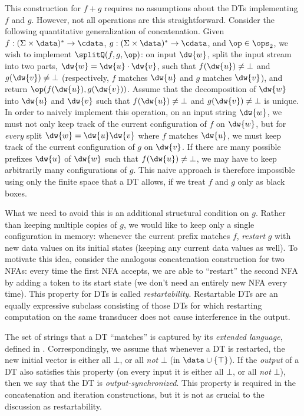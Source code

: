 This construction for $f+g$ requires no assumptions about the DTs implementing $f$ and $g$.
However, not all operations are this straightforward.
Consider the following quantitative generalization of concatenation. Given $f: (\Sigma \times \data)^{*} \to \cdata$, $g: (\Sigma \times \data)^{*} \to \cdata$, and $\op \in \ops_2$, we wish to implement $\splitQ(f,g,\op)$:
on input $\dw{w}$, split the input stream into two parts, $\dw{w} = \dw{u} \cdot \dw{v}$, such that $f(\dw{u}) \ne \bot$ and $g(\dw{v}) \ne \bot$ (respectively, $f$ matches $\dw{u}$ and $g$ matches $\dw{v}$), and return $\op(f(\dw{u}),g(\dw{v}))$. Assume that the decomposition of $\dw{w}$ into $\dw{u}$ and $\dw{v}$ such that $f(\dw{u}) \ne \bot$ and $g(\dw{v}) \ne \bot$ is unique.
In order to naively implement this operation, on an input string $\dw{w}$, we must not only keep track of the current
configuration of $f$ on $\dw{w}$,
but for \emph{every} split $\dw{w} = \dw{u} \dw{v}$ where $f$ matches $\dw{u}$,
we must keep track of the current configuration of $g$ on $\dw{v}$.
If there are many possible prefixes $\dw{u}$ of $\dw{w}$ such that $f(\dw{u}) \ne \bot$, we may have to keep arbitrarily many configurations of $g$. This naive approach is therefore impossible using only the finite space that a DT allows, if we treat $f$ and $g$ only as black boxes.

What we need to avoid this is an additional structural condition on $g$. Rather than keeping multiple copies of $g$, we would like to keep only a single configuration in memory: whenever the current prefix matches $f$, \emph{restart} $g$ with new data values on its initial states (keeping any current data values as well).
To motivate this idea, consider the analogous concatenation construction for two NFAs: every time the first NFA accepts, we are able to ``restart'' the second NFA by adding a token to its start state (we don't need an entirely new NFA every time).
This property for DTs is called \emph{restartability}.
Restartable DTs are an equally expressive subclass
consisting of those DTs for which restarting computation on the same transducer does not cause interference in the output.

The set of strings that a DT ``matches'' is captured by its \emph{extended language}, defined in . Correspondingly, we assume that whenever a DT is restarted, the new initial vector is either all $\bot$, or all \emph{not} $\bot$ (in $\data \cup \{\top\}$). If the \emph{output} of a DT also satisfies this property (on every input it is either all $\bot$, or all \emph{not} $\bot$), then we say that the DT is \emph{output-synchronized}. This property is required in the concatenation and iteration constructions, but it is not as crucial to the discussion as restartability.

